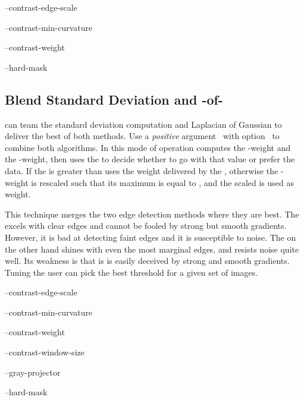 \begin{optionsummary}
\item[--contrast-edge-scale] \sectionName~
\item[--contrast-min-curvature] \sectionName~
\item[--contrast-weight] \sectionName~
\item[--hard-mask] \sectionName~
\end{optionsummary}


\subsection[Blend \acronym{SDev} and \acronym{LoG}]%
{\label{sec:blend-sdev-and-log}%
%
%
Blend Standard Deviation and \hyp{}of\hyp{}}

\App{} can team the standard deviation computation and Laplacian of Gaussian to deliver the best
of both methods.  Use a \emph{positive} argument~ with
option~ to combine both algorithms.  In this mode of operation
\App{} computes the -weight and the -weight, then uses the
 to decide whether to go with that value or prefer the  data.  If the
 is greater than  \App{} uses the weight delivered by the
, otherwise the -weight is rescaled such that its maximum is equal to
, and the scaled  is used as weight.

This technique merges the two edge detection methods where they are best.  The 
excels with clear edges and cannot be fooled by strong but smooth gradients.  However, it is bad
at detecting faint edges and it is susceptible to noise.  The  on the other hand
shines with even the most marginal edges, and resists noise quite well.  Its weakness is that is
is easily deceived by strong and smooth gradients.  Tuning  the user can pick
the best threshold for a given set of images.

\begin{optionsummary}
\item[--contrast-edge-scale] \sectionName~
\item[--contrast-min-curvature] \sectionName~
\item[--contrast-weight] \sectionName~
\item[--contrast-window-size] \sectionName~
\item[--gray-projector] \sectionName~
\item[--hard-mask] \sectionName~
\end{optionsummary}


